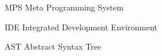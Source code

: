 
\begin{abbreviations}
	\item[MPS] Meta Programming System
	\item[IDE] Integrated Development Environment
	\item[AST] Abstract Syntax Tree
\end{abbreviations}
